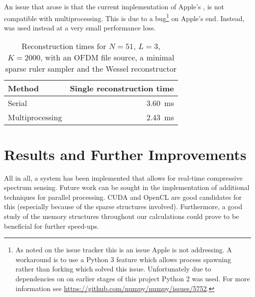 \documentclass[a4paper, openany, oneside]{memoir}
\begin{document}
An issue that arose is that the current implementation of Apple's , is not compatible with multiprocessing. This is due to a bug\footnote{As noted on the  issue tracker this is an issue Apple is not addressing. A workaround is to use a Python 3 feature which allows process spawning rather than forking which solved this issue. Unfortunately due to dependencies on  on earlier stages of this project Python 2 was used. For more information see \url{https://github.com/numpy/numpy/issues/5752}.} on Apple's end. Instead,  was used instead at a very small performance loss.

\begin{table}
    \centering
    \caption{Reconstruction times for $N = 51$, $L=3$, $K=2000$, with an OFDM file source, a minimal sparse ruler sampler and the Wessel reconstructor}
    \label{tab:mp}
    \begin{tabular}{lr}
        \toprule
        Method          & Single reconstruction time\\
        \midrule
        Serial          & \SI{3.60}{\milli\second}\\
        Multiprocessing & \SI{2.43}{\milli\second}\\
        \bottomrule
    \end{tabular}
\end{table}

\section{Results and Further Improvements}
\label{sec:results}
All in all, a system has been implemented that allows for real-time compressive spectrum sensing. Future work can be sought in the implementation of additional techniques for parallel processing. CUDA and OpenCL are good candidates for this (especially because of the sparse structures involved). Furthermore, a good study of the memory structures throughout our calculations could prove to be beneficial for further speed-ups.
\end{document}
